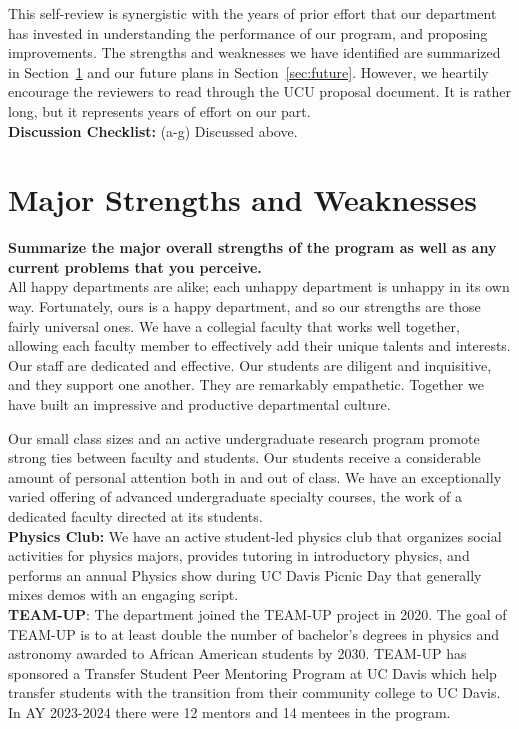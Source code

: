 \documentclass[12pt]{article}
\begin{document}
This self-review is synergistic with the years of prior effort that
our department has invested in understanding the performance of our
program, and proposing improvements.  The strengths and weaknesses we
have identified are summarized in Section~\ref{sec:snws} and our
future plans in Section~\ref{sec:future}.  However, we heartily
encourage the reviewers to read through the UCU proposal document.  It
is rather long, but it represents years of effort on our part.\\[3pt]

\noindent
{\bf Discussion Checklist:} (a-g) Discussed above.

\newpage
\section{Major Strengths and Weaknesses}
\label{sec:snws}

{\bf Summarize the major overall strengths of the program as well as
  any current problems that you perceive.}\\[3pt]

\noindent
All happy departments are alike; each unhappy department is unhappy in
its own way.  Fortunately, ours is a happy department, and so our
strengths are those fairly universal ones.  We have a collegial
faculty that works well together, allowing each faculty member to
effectively add their unique talents and interests.  Our staff are
dedicated and effective.  Our students are diligent and inquisitive,
and they support one another.  They are remarkably empathetic.
Together we have built an impressive and productive departmental
culture.

Our small class sizes and an active undergraduate research program
promote strong ties between faculty and students.  Our students
receive a considerable amount of personal attention both in and out of
class.  We have an exceptionally varied offering of advanced
undergraduate specialty courses, the work of a dedicated faculty
directed at its students.\\[3pt]

\noindent
{\bf Physics Club:} We have an active student-led physics club that organizes social activities for physics majors, provides tutoring in introductory physics, and performs an annual Physics show during UC Davis Picnic Day that generally mixes demos with an engaging script.\\[3pt]

\noindent
{\bf TEAM-UP}:
The department joined the TEAM-UP project in 2020.  The goal of TEAM-UP is to at least double the number of bachelor’s degrees in physics and astronomy awarded to African American students by 2030.
TEAM-UP has sponsored a Transfer Student Peer Mentoring Program at UC Davis which help transfer students with the transition from their community college to UC Davis.  In AY 2023-2024 there were 12 mentors and 14 mentees in the program.\\[3pt]
\end{document}
